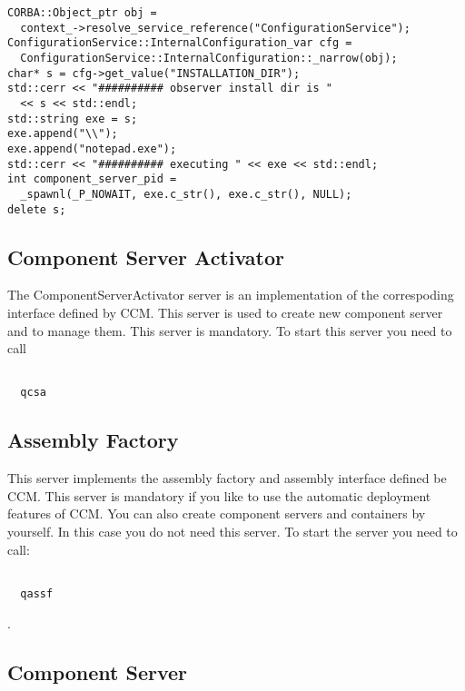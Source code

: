 \documentclass[12pt,a4paper]{report}
\begin{document}
\small
\begin{verbatim}
CORBA::Object_ptr obj = 
  context_->resolve_service_reference("ConfigurationService");
ConfigurationService::InternalConfiguration_var cfg =
  ConfigurationService::InternalConfiguration::_narrow(obj);
char* s = cfg->get_value("INSTALLATION_DIR");
std::cerr << "########## observer install dir is "
  << s << std::endl;
std::string exe = s;
exe.append("\\");
exe.append("notepad.exe");
std::cerr << "########## executing " << exe << std::endl;
int component_server_pid = 
  _spawnl(_P_NOWAIT, exe.c_str(), exe.c_str(), NULL);
delete s;
\end{verbatim}
\normalsize

\subsection{Component Server Activator}
\label{sec:ComponentServerActivator}

The ComponentServerActivator server is an implementation of the correspoding interface defined by CCM. This server is used to create new component server and to manage them. This server is mandatory. To start this server you need to call 

\small
\begin{verbatim}

  qcsa

\end{verbatim}
\normalsize

\subsection{Assembly Factory}
\label{sec:AssemblyFactory}

This server implements the assembly factory and assembly interface defined be CCM. This server is mandatory if you like to use the automatic deployment features of CCM. You can also create component servers and containers by yourself. In this case you do not need this server. To start the server you need to call:

\small
\begin{verbatim}

  qassf

\end{verbatim}
\normalsize

.

\subsection{Component Server}
\label{sec:ComponentServer}
\end{document}
